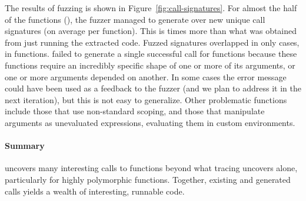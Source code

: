 \documentclass[sigplan,anonymous,review]{acmart}
\begin{document}
The results of fuzzing is shown in Figure~\ref{fig:call-signatures}.
For almost the half of the functions (\UFNumFunctionSignatrSignatureRatio), the fuzzer managed to generate over \UFSignatrSignaturesRnd new unique call signatures (on average \UFAvgNewSignatrSignature per function).
This is \UFSignatrBaselineSignaturesRatio times more than what was obtained from just running the extracted code.
Fuzzed signatures overlapped in only \UFSharedSignature cases, in \UFSharedSignatureFunction functions.
\tool failed to generate a single successful call for \UFNumMissingFunctionSignatr functions because these functions require an incredibly specific shape of one or more of its arguments, or one or more arguments depended on another.
In some cases the error message could have been used as a feedback to the fuzzer (and we plan to address it in the next iteration), but this is not easy to generalize.
Other problematic functions include those that use non-standard scoping, and those that manipulate arguments as unevaluated expressions, evaluating them in custom environments.

\paragraph{Summary}

\tool uncovers many interesting calls to functions beyond what tracing uncovers alone, particularly for highly polymorphic functions.
Together, existing and generated calls yields a wealth of interesting, runnable code.




\end{document}

